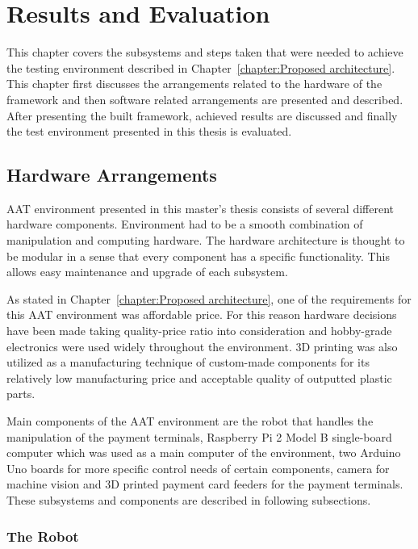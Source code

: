 
\chapter{Results and Evaluation}
\label{chapter:Results and Evaluation}

This chapter covers the subsystems and steps taken that were needed to achieve the testing environment described in Chapter~\ref{chapter:Proposed architecture}. This chapter first discusses the arrangements related to the hardware of the framework and then software related arrangements are presented and described. After presenting the built framework, achieved results are discussed and finally the test environment presented in this thesis is evaluated.

\section{Hardware Arrangements}
\label{section:Hardware arrangements}

AAT environment presented in this master's thesis consists of several different hardware components. Environment had to be a smooth combination of manipulation and computing hardware. The hardware architecture is thought to be modular in a sense that every component has a specific functionality. This allows easy maintenance and upgrade of each subsystem.

As stated in Chapter~\ref{chapter:Proposed architecture}, one of the requirements for this AAT environment was affordable price. For this reason hardware decisions have been made taking quality-price ratio into consideration and hobby-grade electronics were used widely throughout the environment. 3D printing was also utilized as a manufacturing technique of custom-made components for its relatively low manufacturing price and acceptable quality of outputted plastic parts.

Main components of the AAT environment are the robot that handles the manipulation of the payment terminals, Raspberry Pi 2 Model B single-board computer which was used as a main computer of the environment, two Arduino Uno boards for more specific control needs of certain components, camera for machine vision and 3D printed payment card feeders for the payment terminals. These subsystems and components are described in following subsections.

\subsection{The Robot}
\label{subsection:Robot}

